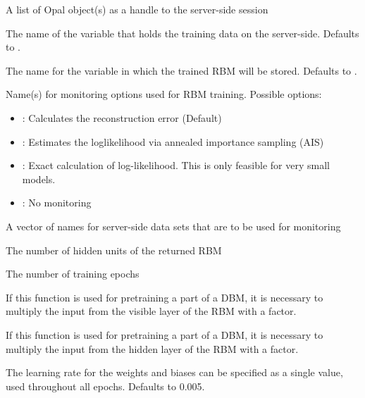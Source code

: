 \begin{Arguments}
\begin{ldescription}
\item[\code{datasources}] A list of Opal object(s) as a handle to the server-side session

\item[\code{data}] The name of the variable that holds the training data on the server-side.
Defaults to .

\item[\code{newobj}] The name for the variable in which the trained RBM will be stored.
Defaults to .

\item[\code{monitoring}] Name(s) for monitoring options used for RBM training.
Possible options:
\begin{itemize}

\item {}: Calculates the reconstruction error (Default)
\item {}: Estimates the loglikelihood via annealed importance sampling (AIS)
\item {}: Exact calculation of log-likelihood.
This is only feasible for very small models.
\item {}: No monitoring

\end{itemize}


\item[\code{monitoringdata}] A vector of names for server-side data sets that are to be used for
monitoring

\item[\code{nhidden}] The number of hidden units of the returned RBM

\item[\code{epochs}] The number of training epochs

\item[\code{upfactor}] If this function is used for pretraining a part of
a DBM, it is necessary to multiply the input from the visible layer of the RBM with a factor.

\item[\code{downfactor}] If this function is used for pretraining a part of
a DBM, it is necessary to multiply the input from the hidden layer of the RBM with a factor.

\item[\code{learningrate}] The learning rate for the weights and biases
can be specified as a single value, used throughout all epochs. Defaults to 0.005.


\end{ldescription}
\end{Arguments}
